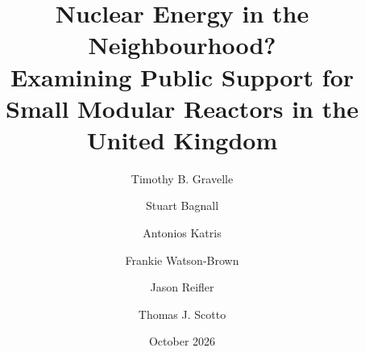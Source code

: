 \documentclass[a4paper, 11pt]{article}
\date{October 2026}
\author[1]{Timothy B. Gravelle}
\author[2]{Stuart Bagnall}
\author[2]{Antonios Katris}
\author[2]{Frankie Watson-Brown}
\author[3]{Jason Reifler}
\author[2]{Thomas J. Scotto}
\affil[1]{Wilfrid Laurier University}
\affil[2]{University of Strathclyde}
\affil[3]{University of Southampton}
\title{Nuclear Energy in the Neighbourhood?\\Examining Public Support for Small Modular Reactors in the United Kingdom}
\begin{document}
\clearpage
{}
\renewcommand{\thepage}{A\arabic{page}}

\singlespacing



\newpage



\newpage



\newpage



\newpage



\newpage


\end{document}
